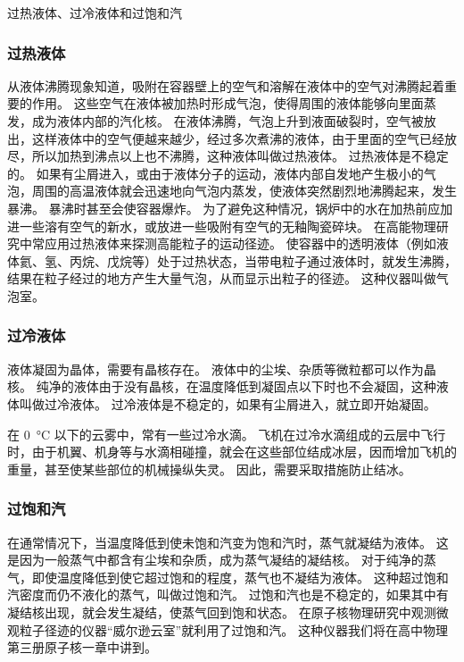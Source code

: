 \begin{Reading}{过热液体、过冷液体和过饱和汽}
\subsubsection*{过热液体} 

从液体沸腾现象知道，吸附在容器壁上的空气和溶解在液体中的空气对沸腾起着重要的作用。
这些空气在液体被加热时形成气泡，使得周围的液体能够向里面蒸发，成为液体内部的汽化核。
在液体沸腾，气泡上升到液面破裂时，空气被放出，这样液体中的空气便越来越少，经过多次煮沸的液体，由于里面的空气已经放尽，所以加热到沸点以上也不沸腾，这种液体叫做过热液体。
过热液体是不稳定的。
如果有尘屑进入，或由于液体分子的运动，液体内部自发地产生极小的气泡，周围的高温液体就会迅速地向气泡内蒸发，使液体突然剧烈地沸腾起来，发生暴沸。
暴沸时甚至会使容器爆炸。
为了避免这种情况，锅炉中的水在加热前应加进一些溶有空气的新水，或放进一些吸附有空气的无釉陶瓷碎块。
在高能物理研究中常应用过热液体来探测高能粒子的运动径迹。
使容器中的透明液体（例如液体氦、氢、丙烷、戊烷等）处于过热状态，当带电粒子通过液体时，就发生沸腾，结果在粒子经过的地方产生大量气泡，从而显示出粒子的径迹。
这种仪器叫做气泡室。

\subsubsection*{过冷液体} 
液体凝固为晶体，需要有晶核存在。
液体中的尘埃、杂质等微粒都可以作为晶核。
纯净的液体由于没有晶核，在温度降低到凝固点以下时也不会凝固，这种液体叫做过冷液体。
过冷液体是不稳定的，如果有尘屑进入，就立即开始凝固。

在 \qty{0}{\celsius} 以下的云雾中，常有一些过冷水滴。
飞机在过冷水滴组成的云层中飞行时，由于机翼、机身等与水滴相碰撞，就会在这些部位结成冰层，因而增加飞机的重量，甚至使某些部位的机械操纵失灵。
因此，需要采取措施防止结冰。

\subsubsection*{过饱和汽} 
在通常情况下，当温度降低到使未饱和汽变为饱和汽时，蒸气就凝结为液体。
这是因为一般蒸气中都含有尘埃和杂质，成为蒸气凝结的凝结核。
对于纯净的蒸气，即使温度降低到使它超过饱和的程度，蒸气也不凝结为液体。
这种超过饱和汽密度而仍不液化的蒸气，叫做过饱和汽。
过饱和汽也是不稳定的，如果其中有凝结核出现，就会发生凝结，使蒸气回到饱和状态。
在原子核物理研究中观测微观粒子径迹的仪器“威尔逊云室”就利用了过饱和汽。
这种仪器我们将在高中物理第三册原子核一章中讲到。
\end{Reading}

